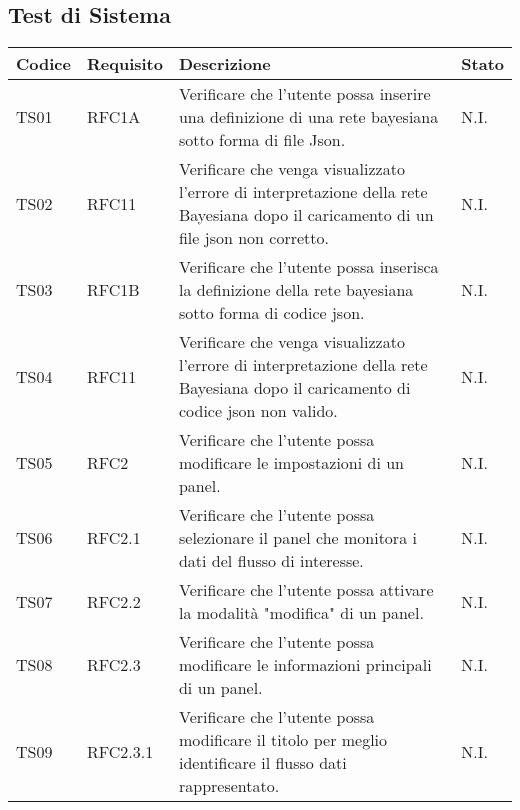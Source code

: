 \subsection{Test di Sistema}
\begin{table}[!htpb]
	\centering
	\renewcommand{\arraystretch}{2} 
	\begin{tabular}{|l|l|p{10cm}|l|}
		\rowcolor{orange!50}
		\hline
		\textbf{Codice} & \textbf{Requisito}& \textbf{Descrizione} & \textbf{Stato}\\ 
		\hline
		TS01 & RFC1A & 
			Verificare che l'utente possa inserire una definizione di una rete bayesiana sotto forma di file Json.
			& N.I.\\
		\hline
		TS02 & RFC11 & 
			Verificare che venga visualizzato l'errore di interpretazione della rete Bayesiana dopo il caricamento di un file json non corretto. 
			& N.I.\\
		\hline
		TS03 & RFC1B 	& 
			Verificare che l'utente possa inserisca la definizione della rete bayesiana sotto forma di codice json. 
			& N.I.\\
		\hline
		TS04 & RFC11 	& 
			Verificare che venga visualizzato l'errore di interpretazione della rete Bayesiana dopo il caricamento di codice json non valido. 
			& N.I.\\
		\hline
		TS05 & RFC2 	& 
			Verificare che l’utente possa modificare le impostazioni di un panel. 
			& N.I.\\
		\hline
		TS06 & RFC2.1 	&
			Verificare che l'utente possa selezionare il panel che monitora i dati del flusso di interesse.
			\newline
			& N.I.\\
		\hline
		TS07 & RFC2.2 	&
			Verificare che l'utente possa attivare la modalità "modifica" di un panel.
			& N.I.\\
		\hline
		TS08 & RFC2.3 	&
			Verificare che l’utente possa modificare le informazioni principali di un panel. 
			& N.I.\\
		\hline
		TS09 & RFC2.3.1 &
			Verificare che l'utente possa modificare il titolo per meglio identificare il flusso dati rappresentato.
			& N.I.\\
		\hline
	\end{tabular}
\end{table}
